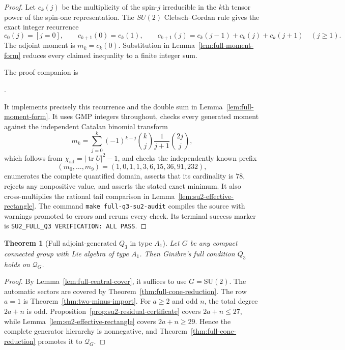 \documentclass[11pt,reqno]{amsart}
\theoremstyle{plain}
\newtheorem{theorem}{Theorem}[section]
\theoremstyle{definition}
\newcommand{\chiad}{\chi_{\mathrm{ad}}}
\newcommand{\Qcone}{\mathcal Q}
\begin{document}
\begin{proof}
Let $c_k(j)$ be the multiplicity of the spin-$j$ irreducible in the $k$th
tensor power of the spin-one representation.  The $SU(2)$
Clebsch--Gordan rule gives the exact integer recurrence
\[
 c_0(j)=[j=0],\qquad
 c_{k+1}(0)=c_k(1),\qquad
 c_{k+1}(j)=c_k(j-1)+c_k(j)+c_k(j+1)\quad(j\geq1).
\]
The adjoint moment is $m_k=c_k(0)$.  Substitution in
Lemma~\ref{lem:full-moment-form} reduces every claimed inequality to a
finite integer sum.

The proof companion is
\begin{center}
.
\end{center}
It implements precisely this recurrence and the double sum in
Lemma~\ref{lem:full-moment-form}.  It uses GMP integers throughout, checks
every generated moment against the independent Catalan binomial transform
\[
 m_k=\sum_{j=0}^k(-1)^{k-j}\binom kj
 \frac1{j+1}\binom{2j}{j},
\]
which follows from $\chiad=|\operatorname{tr}U|^2-1$, and checks
the independently known prefix
\[
 (m_0,\ldots,m_9)=(1,0,1,1,3,6,15,36,91,232),
\]
enumerates the complete quantified domain, asserts that its cardinality is
$78$, rejects any nonpositive value, and asserts the stated exact minimum.
It also cross-multiplies the rational tail comparison in
Lemma~\ref{lem:su2-effective-rectangle}.  The command
\texttt{make full-q3-su2-audit} compiles the source with warnings promoted to
errors and reruns every check.  Its terminal success marker is
\texttt{SU2\_FULL\_Q3 VERIFICATION: ALL PASS}.
\end{proof}

\begin{theorem}[Full adjoint-generated $Q_3$ in type $A_1$]
\label{thm:su2-full-cone}
Let $G$ be any compact connected group with Lie algebra of type $A_1$.
Then Ginibre's full condition $Q_3$ holds on $\Qcone_G$.
\end{theorem}

\begin{proof}
By Lemma~\ref{lem:full-central-cover}, it suffices to use $G=\mathrm{SU}(2)$.
The automatic sectors are covered by
Theorem~\ref{thm:full-cone-reduction}.  The row $a=1$ is
Theorem~\ref{thm:two-minus-import}.  For $a\geq2$ and odd $n$, the total degree
$2a+n$ is odd.  Proposition~\ref{prop:su2-residual-certificate} covers
$2a+n\leq27$, while Lemma~\ref{lem:su2-effective-rectangle} covers
$2a+n\geq29$.  Hence the complete generator hierarchy is nonnegative, and
Theorem~\ref{thm:full-cone-reduction} promotes it to $\Qcone_G$.
\end{proof}
\end{document}
